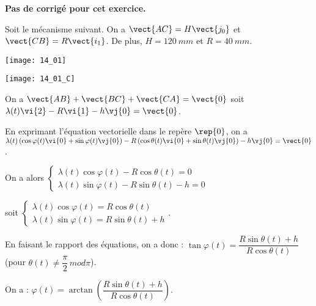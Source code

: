 \normaltrue \difficilefalse \tdifficilefalse
\correctiontrue


\setcounter{numques}{0}
\ifcorrection
\else
\textbf{Pas de corrigé pour cet exercice.}
\fi

\ifprof
\else
Soit le mécanisme suivant. On a $\vect{AC}=H\vect{j_0}$ et $\vect{CB}=R\vect{i_1}$. De plus, 
$H=\SI{120}{mm}$ et $R=\SI{40}{mm}$. 

\begin{center}
\texttt{[image: 14\_01]}
\end{center}
\fi


\ifprof

\begin{center}
\texttt{[image: 14\_01\_C]}
\end{center}
\else
\fi

\ifprof
On a $\vect{AB}+\vect{BC}+\vect{CA}=\vect{0}$ soit 
$\lambda(t)\vi{2}-R\vi{1}-h\vj{0}=\vect{0}$.

En exprimant l'équation vectorielle dans le repère $\rep{0}$, on a 
$\lambda(t)\left( \cos\varphi(t)\vi{0}+\sin\varphi(t)\vj{0}\right)-R\left( \cos\theta(t)\vi{0}+\sin\theta(t)\vj{0}\right)-h\vj{0}=\vect{0}$.

On a alors 
$
\left\{
\begin{array}{l}
\lambda(t)\cos\varphi(t)-R \cos\theta(t)=0 \\
\lambda(t)\sin\varphi(t)-R\sin\theta(t)-h=0
\end{array}
\right.
$

soit 
$
\left\{
\begin{array}{l}
\lambda(t)\cos\varphi(t)=R \cos\theta(t) \\
\lambda(t)\sin\varphi(t)=R\sin\theta(t)+h
\end{array}
\right.
$.

En faisant le rapport des équations, on a donc : $\tan\varphi(t)=\dfrac{R\sin\theta(t)+h}{R \cos\theta(t)}$ (pour $\theta(t)\neq \dfrac{\pi}{2} \, mod \pi$).

\else
\fi

\ifprof
On a : $ \varphi(t)=\arctan \left( \dfrac{R\sin\theta(t)+h}{R \cos\theta(t)}\right)$.

